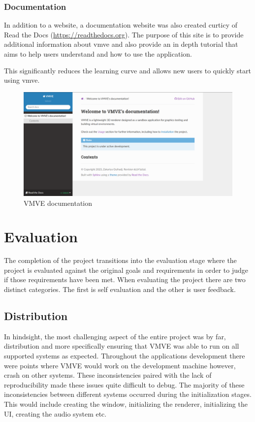 \documentclass[11pt]{article}
\begin{document}
\subsubsection{Documentation}
In addition to a website, a documentation website was also created curticy of
Read the Docs (\href{https://readthedocs.org}{https://readthedocs.org}). The
purpose of this site is to provide additional information about \gls{vmve} and
also provide an in depth tutorial that aims to help users understand and how to
use the application.

This significantly reduces the learning curve and allows new users to quickly
start using \gls{vmve}.

\begin{figure}[h!]
  \centering
  \includegraphics[width=\textwidth]{images/documentation.png}
  \caption{VMVE documentation}
  \label{fig:documentation}
\end{figure}


\section{Evaluation}
The completion of the project transitions into the evaluation stage where the
project is evaluated against the original goals and requirements in order to
judge if those requirements have been met. When evaluating the project there are
two distinct categories. The first is self evaluation and the other is user
feedback. 


\subsection{Distribution}
In hindsight, the most challenging aspect of the entire project was by far,
distribution and more specifically ensuring that VMVE was able to run on all
supported systems as expected. Throughout the applications development there
were points where VMVE would work on the development machine however, crash on
other systems. These inconsistencies paired with the lack of reproducibility
made these issues quite difficult to debug. The majority of these
inconsistencies between different systems occurred during the initialization
stages. This would include creating the window, initializing the renderer,
initializing the UI, creating the audio system etc.
\end{document}

